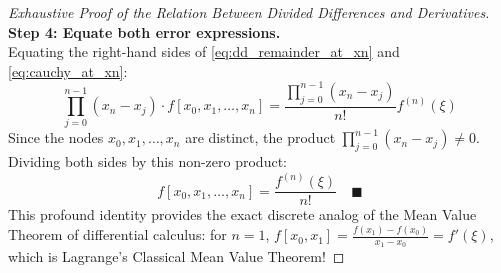 \begin{proof}[Exhaustive Proof of the Relation Between Divided Differences and Derivatives]
\noindent\textbf{Step 4: Equate both error expressions.} \\
Equating the right-hand sides of \eqref{eq:dd_remainder_at_xn} and \eqref{eq:cauchy_at_xn}:
\begin{equation}
    \prod_{j=0}^{n-1}(x_n - x_j) \cdot f[x_0, x_1, \dots, x_n] = \frac{\prod_{j=0}^{n-1}(x_n - x_j)}{n!} f^{(n)}(\xi)
\end{equation}
Since the nodes $x_0, x_1, \dots, x_n$ are distinct, the product $\prod_{j=0}^{n-1}(x_n - x_j) \ne 0$. Dividing both sides by this non-zero product:
\begin{equation}
    \boxed{f[x_0, x_1, \dots, x_n] = \frac{f^{(n)}(\xi)}{n!}} \quad \blacksquare
\end{equation}
This profound identity provides the exact discrete analog of the Mean Value Theorem of differential calculus:
for $n = 1$, $f[x_0, x_1] = \frac{f(x_1) - f(x_0)}{x_1 - x_0} = f'(\xi)$, which is Lagrange's Classical Mean Value Theorem!
\end{proof}


